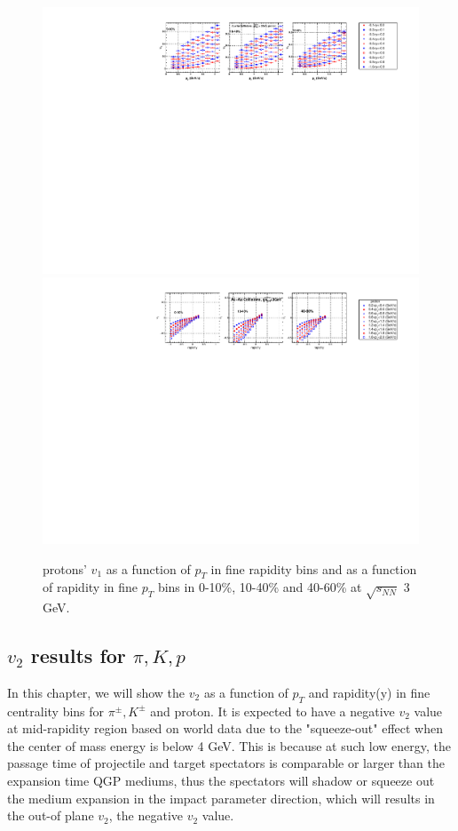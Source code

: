 \begin{figure}[h]
\includegraphics[scale=0.7]{chapter3/fig/2dscan/protonp_y_scan_v1pt.pdf}
\includegraphics[scale=0.7]{chapter3/fig/2dscan/protonp_pt_scan_v1y.pdf}
\caption{protons' $v_{1}$ as a function of $p_{T}$ in fine rapidity bins and as a function of rapidity in fine $p_{T}$ bins in 0-10\%, 10-40\% and 40-60\% at $\sqrt{s_{NN}}$ 3 GeV.}
\label{v1_2dscan_proton}
\end{figure}


\clearpage
\subsection{$v_{2}$ results for $\pi, K, p$}
In this chapter, we will show the $v_{2}$ as a function of $p_{T}$ and rapidity(y) in fine centrality bins for $\pi^{\pm}, K^{\pm}$ and proton. It is expected to have a negative $v_{2}$ value at mid-rapidity region based on world data due to the "squeeze-out" effect when the center of mass energy is below 4 GeV. This is because at such low energy, the passage time of projectile and target spectators is comparable or larger than the expansion time QGP mediums, thus the spectators will shadow or squeeze out the medium expansion in the impact parameter direction, which will results in the out-of plane $v_{2}$, the negative $v_{2}$ value.

